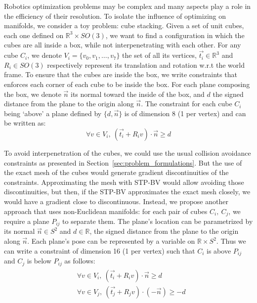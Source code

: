 Robotics optimization problems may be complex and many aspects play a role in the efficiency of their resolution.
To isolate the influence of optimizing on manifolds, we consider a toy problem: cube stacking.
Given a set of unit cubes, each one defined on $\mathbb{R}^3 \times SO(3)$, we want to find a configuration in which the cubes are all inside a box, while not interpenetrating with each other.
For any cube $C_i$, we denote $V_i = \{v_0, v_1, \ldots, v_7\}$  the set of all its vertices, $\vec{t_i}\in\mathbb{R}^3$ and $R_i\in SO(3)$ respectively represent its translation and rotation w.r.t the world frame.
To ensure that the cubes are inside the box, we write constraints that enforces each corner of each cube to be inside the box.
For each plane composing the box, we denote $\vec{n}$ its normal toward the inside of the box, and $d$ the signed distance from the plane to the origin along $\vec{n}$.
The constraint for each cube $C_i$ being `above' a plane defined by $\{d, \vec{n}\}$ is of dimension 8 (1 per vertex) and can be written as:
\begin{equation}
  \forall v\in V_i,\ (\vec{t_i} + R_i v)\cdot \vec{n} \geq d
\end{equation}

To avoid interpenetration of the cubes, we could use the usual collision avoidance constraints as presented in Section~\ref{sec:problem_formulations}.
But the use of the exact mesh of the cubes would generate gradient discontinuities of the constraints.
Approximating the mesh with STP-BV would allow avoiding those discontinuities, but then, if the STP-BV approximates the exact mesh closely, we would have a gradient close to discontinuous.
Instead, we propose another approach that uses non-Euclidean manifolds: for each pair of cubes $C_i,\ C_j$, we require a plane $P_{ij}$ to separate them.
The plane's location can be parametrized by its normal $\vec{n}\in S^2$ and $d\in\mathbb{R}$, the signed distance from the plane to the origin along $\vec{n}$.
Each plane's pose can be represented by a variable on $\mathbb{R} \times S^2$.
Thus we can write a constraint of dimension 16 (1 per vertex) such that $C_i$ is above $P_{ij}$ and $C_j$ is below $P_{ij}$ as follows:
\begin{align}
  \begin{split}
    &\forall v\in V_i,\ (\vec{t_i} + R_i v)\cdot \vec{n} \geq d \\
    &\forall v\in V_j,\ (\vec{t_j} + R_j v)\cdot \left(-\vec{n}\right) \geq -d
  \end{split}
\end{align}

